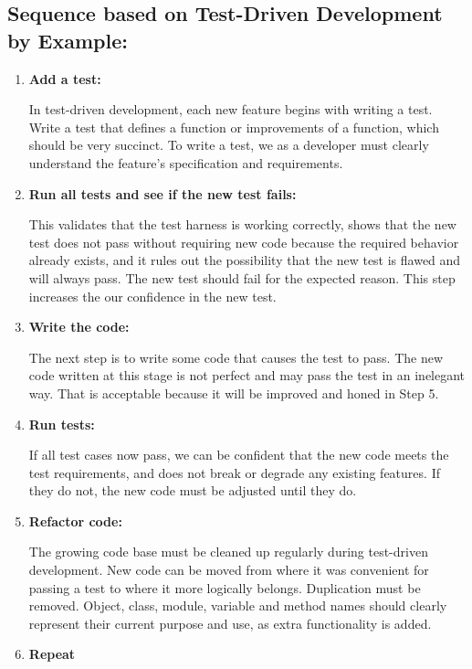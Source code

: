 \subsection{Sequence based on Test-Driven Development by Example:}
\begin{enumerate}
	\item \textbf{Add a test:} \par In test-driven development, each new feature begins with writing a test. Write a test that defines a function or improvements of a function, which should be very succinct. To write a test, we as a developer must clearly understand the feature's specification and requirements.
	
\item \textbf{Run all tests and see if the new test fails:} \par This validates that the test harness is working correctly, shows that the new test does not pass without requiring new code because the required behavior already exists, and it rules out the possibility that the new test is flawed and will always pass. The new test should fail for the expected reason. This step increases the our confidence in the new test.	

\item \textbf{Write the code:} \par The next step is to write some code that causes the test to pass. The new code written at this stage is not perfect and may pass the test in an inelegant way. That is acceptable because it will be improved and honed in Step 5.

\item \textbf{Run tests: } \par If all test cases now pass, we can be confident that the new code meets the test requirements, and does not break or degrade any existing features. If they do not, the new code must be adjusted until they do.	
	
\item \textbf{Refactor code: } \par The growing code base must be cleaned up regularly during test-driven development. New code can be moved from where it was convenient for passing a test to where it more logically belongs. Duplication must be removed. Object, class, module, variable and method names should clearly represent their current purpose and use, as extra functionality is added.

\item \textbf{Repeat}		
	
\end{enumerate}


